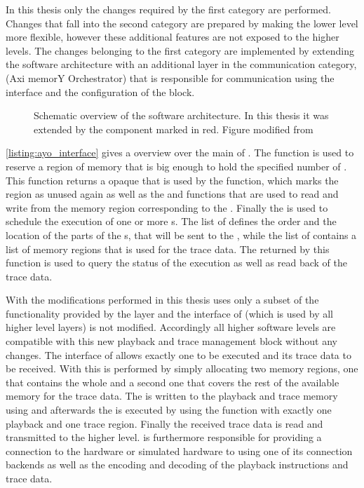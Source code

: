 In this thesis only the changes required by the first category are performed. Changes that fall into the second category are prepared by making the lower level \API{} more flexible, however these additional features are not exposed to the higher levels. The changes belonging to the first category are implemented by extending the \BSSTwo{} software architecture with an additional layer in the communication category, \ayo{} (Axi memorY Orchestrator) that is responsible for communication using the \FAXI{} interface and the configuration of the \AXIDMA{} block.

\begin{figure}[htbp]
\centerline{}
\caption{Schematic overview of the \BSSTwo{} software architecture. In this thesis it was extended by the \ayo{} component marked in red. Figure modified from \autocite{ref:scalable_approach_to_modeling}}\label{dia:flange-dram-overview}
\end{figure}


\autoref{listing:ayo_interface} gives a overview over the main \API{} of \ayo{}. The  function is used to reserve a region of memory that is big enough to hold the specified number of . This function returns a opaque  that is used by the  function, which marks the region as unused again as well as the  and  functions that are used to read and write from the memory region corresponding to the .
Finally the  is used to schedule the execution of one or more \PlaybackProgram{}s. The list of  defines the order and the location of the parts of the \PlaybackProgram{}s, that will be sent to the \pbexec{}, while the list of  contains a list of memory regions that is used for the trace data. The  returned by this function is used to query the status of the execution as well as read back of the trace data.

With the modifications performed in this thesis \hxcomm{} uses only a subset of the functionality provided by the \ayo{} layer and the interface of \hxcomm{} (which is used by all higher level layers) is not modified. Accordingly all higher software levels are compatible with this new playback and trace management block without any changes.
The interface of \hxcomm{} allows exactly one \PlaybackProgram{} to be executed and its trace data to be received. With \ayo{} this is performed by simply allocating two memory regions, one that contains the whole \PlaybackProgram{} and a second one that covers the rest of the available memory for the trace data. The \PlaybackProgram{} is written to the playback and trace memory using  and afterwards the \PlaybackProgram{} is executed by using the  function with exactly one playback and one trace region. Finally the received trace data is read and transmitted to the higher level. \hxcomm{} is furthermore responsible for providing a connection to the hardware or simulated hardware to \ayo{} using one of its connection backends as well as the \UT{} encoding and decoding of the playback instructions and trace data.

